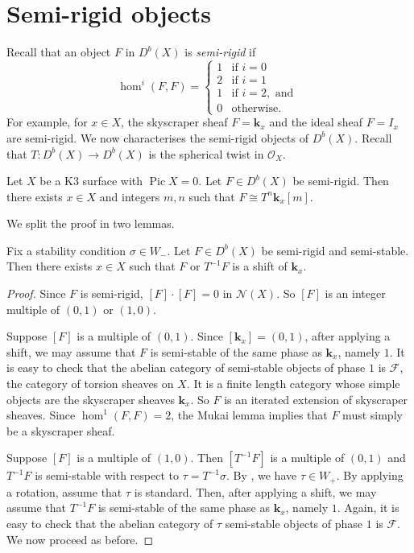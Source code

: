 \documentclass{amsart}
\begin{document}
\section{Semi-rigid objects}\label{sec:semirigid}
Recall that an object \(F\) in \(D^b(X)\) is \emph{semi-rigid} if
\[ \hom^{i}(F,F) =
  \begin{cases}
     1 & \text{if } i = 0\\
    2 &\text{if } i = 1\\
    1 &\text{if } i = 2, \text{ and }\\
    0 &\text{otherwise}.
  \end{cases}
\]
For example, for \(x \in X\), the skyscraper sheaf \(F = \mathbf{k}_x\)  and the ideal sheaf \(F = I_x\) are semi-rigid.
We now characterises the semi-rigid objects of \(D^b(X)\).
Recall that \(T \colon D^b(X) \to D^b(X)\) is the spherical twist in \(\mathcal{O}_{X}\).
\begin{proposition}\label{prop:semirigids}
  Let \(X\) be a K3 surface with \(\operatorname{Pic} X = 0\).
  Let \(F \in D^b(X)\) be semi-rigid.
  Then there exists \(x \in X\) and integers \(m, n\)  such that \(F \cong T^n \mathbf{k}_x[m]\).
\end{proposition}
We split the proof in two lemmas.
\begin{lemma}\label{lem:semistable-semirigid}
  Fix a stability condition \(\sigma \in W_-\).
  Let \(F \in D^b(X)\) be semi-rigid and semi-stable.
  Then there exists \(x \in X\) such that \(F\) or \(T^{-1}F\) is a shift of \(\mathbf{k}_x\).
\end{lemma}
\begin{proof}
  Since \(F\) is semi-rigid, \([F]\cdot[F] = 0\) in \(\mathcal{N}(X)\).
  So \([F]\) is an integer multiple of \((0,1)\) or \((1,0)\).

  Suppose \([F]\) is a multiple of \((0,1)\).
  Since \([\mathbf{k}_x] = (0,1)\), after applying a shift, we may assume that \(F\) is semi-stable of the same phase as \(\mathbf{k}_x\), namely \(1\).
  It is easy to check that the abelian category of semi-stable objects of phase \(1\) is \(\mathcal F\), the category of torsion sheaves on \(X\).
  It is a finite length category whose simple objects are the skyscraper sheaves \(\mathbf{k}_x\).
  So \(F\) is an iterated extension of skyscraper sheaves.
  Since \(\hom^1(F,F) = 2\), the Mukai lemma \cite[Lemma~2.7]{huy.mac.ste:08} implies that \(F\) must simply be a skyscraper sheaf.
  
  Suppose \([F]\) is a multiple of \((1,0)\).
  Then \([T^{-1}F]\) is a multiple of \((0,1)\) and \(T^{-1}F\) is semi-stable with respect to \(\tau = T^{-1}\sigma\).
  By , we have \(\tau \in W_{+}\).
  By applying a rotation, assume that \(\tau\) is standard.
  Then, after applying a shift, we may assume that \(T^{-1}F\) is semi-stable of the same phase as \(\mathbf{k}_x\), namely \(1\).
  Again, it is easy to check that the abelian category of \(\tau\) semi-stable objects of phase \(1\) is \(\mathcal{F}\).
  We now proceed as before.  
\end{proof}
\end{document}
